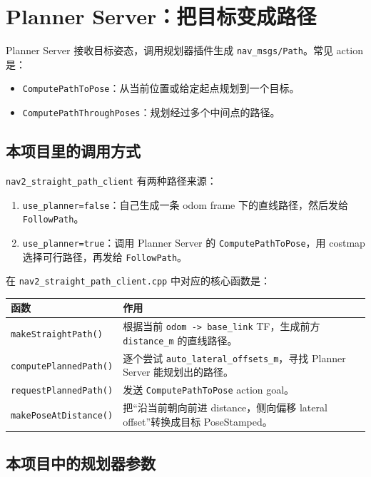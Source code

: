 \documentclass[UTF8,11pt,a4paper,openany]{ctexrep}
\newcommand{\code}[1]{\nolinkurl{#1}}
\newcommand{\topic}[1]{\nolinkurl{#1}}
\newcommand{\param}[1]{\nolinkurl{#1}}
\newcommand{\file}[1]{\nolinkurl{#1}}
\newcommand{\pkg}[1]{\nolinkurl{#1}}
\newcommand{\actionname}[1]{\nolinkurl{#1}}
\begin{document}
\section{Planner Server：把目标变成路径}

Planner Server 接收目标姿态，调用规划器插件生成 \code{nav_msgs/Path}。常见 action 是：

\begin{itemize}
  \item \actionname{ComputePathToPose}：从当前位置或给定起点规划到一个目标。
  \item \actionname{ComputePathThroughPoses}：规划经过多个中间点的路径。
\end{itemize}

\subsection{本项目里的调用方式}

\pkg{nav2_straight_path_client} 有两种路径来源：

\begin{enumerate}
  \item \param{use_planner=false}：自己生成一条 odom frame 下的直线路径，然后发给 \actionname{FollowPath}。
  \item \param{use_planner=true}：调用 Planner Server 的 \actionname{ComputePathToPose}，用 costmap 选择可行路径，再发给 \actionname{FollowPath}。
\end{enumerate}

在 \file{nav2_straight_path_client.cpp} 中对应的核心函数是：

\begin{longtable}{L{0.31\textwidth}L{0.59\textwidth}}
\toprule
函数 & 作用 \\
\midrule
\code{makeStraightPath()} & 根据当前 \topic{odom -> base_link} TF，生成前方 \param{distance_m} 的直线路径。 \\
\code{computePlannedPath()} & 逐个尝试 \param{auto_lateral_offsets_m}，寻找 Planner Server 能规划出的路径。 \\
\code{requestPlannedPath()} & 发送 \actionname{ComputePathToPose} action goal。 \\
\code{makePoseAtDistance()} & 把“沿当前朝向前进 distance，侧向偏移 lateral offset”转换成目标 PoseStamped。 \\
\bottomrule
\end{longtable}

\subsection{本项目中的规划器参数}
\end{document}
